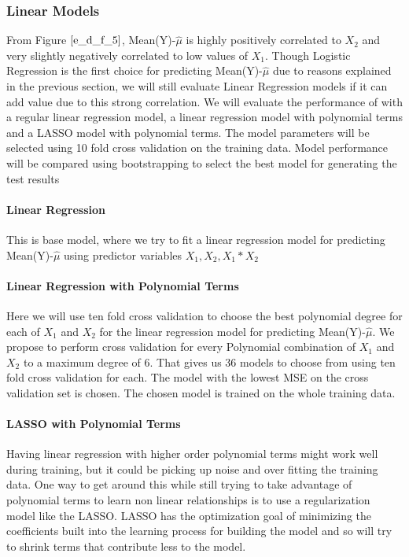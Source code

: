 \documentclass[twoside,12pt]{article}
\begin{document}
\subsubsection{Linear Models}
From Figure  $\eqref{e_d_f_5}$, Mean(Y)-$\hat{\mu}$ is highly positively correlated to $X_2$ and very slightly negatively correlated to low values of $X_1$. Though Logistic Regression is the first choice for predicting Mean(Y)-$\hat{\mu}$ due to reasons explained in the previous section, we will still evaluate Linear Regression models if it can add value due to this strong correlation. We will evaluate the performance of  with a regular linear regression model, a linear regression model with polynomial terms and a LASSO model with polynomial terms. The model parameters will be selected using 10 fold cross validation on the training data. Model performance will be compared using bootstrapping to select the best model for generating the test results

\paragraph{Linear Regression}
This is base model, where we try to fit a linear regression model for predicting Mean(Y)-$\hat{\mu}$ using predictor variables $X_1,X_2,X_1*X_2$

\paragraph{Linear Regression with Polynomial Terms}
Here we will use ten fold cross validation to choose the best polynomial degree for each of $X_1$ and $X_2$ for the linear regression model for predicting  Mean(Y)-$\hat{\mu}$. We propose to perform cross validation for every Polynomial combination of $X_1$ and $X_2$ to a maximum degree of 6. That gives us 36 models to choose from using ten fold cross validation for each. The model with the lowest MSE on the cross validation set is chosen. The chosen model is trained on the whole training data.

\paragraph{LASSO with Polynomial Terms}
Having linear regression with higher order polynomial terms might work well during training, but it could be picking up noise and over fitting the training data. One way to get around this while still trying to take advantage of polynomial terms to learn non linear relationships is to use a regularization model like the LASSO. LASSO has the optimization goal of minimizing the coefficients built into the learning process for building the model and so will try to shrink terms that contribute less to the model.
\end{document}
